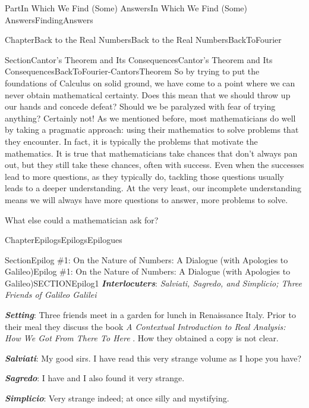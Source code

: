 \documentclass[oneside,10pt,]{book}
\newcommand{\alert}[1]{\textbf{\textit{#1}}}
\newcommand{\pubtitle}[1]{\textsl{#1}}
\numberwithin{equation}{part}
\begin{document}
\begin{partptx}{Part}{In Which We Find (Some) Answers}{}{In Which We Find (Some) Answers}{}{}{FindingAnswers}
\begin{chapterptx}{Chapter}{Back to the Real Numbers}{}{Back to the Real Numbers}{}{}{BackToFourier}
\begin{sectionptx}{Section}{Cantor's Theorem and Its Consequences}{}{Cantor's Theorem and Its Consequences}{}{}{BackToFourier-CantorsTheorem}
So by trying to put the foundations of Calculus on solid ground, we have come to a point where we can never obtain mathematical certainty.  Does this mean that we should throw up our hands and concede defeat?  Should we be paralyzed with fear of trying anything?  Certainly not!  As we mentioned before, most mathematicians do well by taking a pragmatic approach: using their mathematics to solve problems that they encounter.  In fact, it is typically the problems that motivate the mathematics.  It is true that mathematicians take chances that don't always pan out, but they still take these chances, often with success.  Even when the successes lead to more questions, as they typically do, tackling those questions usually leads to a deeper understanding.  At the very least, our incomplete understanding means we will always have more questions to answer, more problems to solve.%
\par
What else could a mathematician ask for?%
\end{sectionptx}
\end{chapterptx}
%
%
\typeout{************************************************}
\typeout{************************************************}
%
\begin{chapterptx}{Chapter}{Epilogs}{}{Epilogs}{}{}{Epilogues}
\renewcommand*{\chaptername}{Chapter}
%
%
\typeout{************************************************}
\typeout{************************************************}
%
\begin{sectionptx}{Section}{Epilog \#1: On the Nature of Numbers: A Dialogue (with Apologies to Galileo)}{}{Epilog \#1: On the Nature of Numbers: A Dialogue (with Apologies to Galileo)}{}{}{SECTIONEpilog1}
\alert{Interlocuters}: \emph{Salviati, Sagredo, and Simplicio; Three Friends of Galileo Galilei}%
\par
\alert{Setting}: Three friends meet in a garden for lunch in Renaissance Italy.  Prior to their meal they discuss the book \pubtitle{A Contextual Introduction to Real Analysis: How We Got From There To Here} . How they obtained a copy is not clear.%
\par
\alert{Salviati}: My good sirs. I have read this very strange volume as I hope you have?%
\par
\alert{Sagredo}: I have and I also found it very strange.%
\par
\alert{Simplicio}: Very strange indeed; at once silly and mystifying.%

\end{sectionptx}
\end{chapterptx}
\end{partptx}
\end{document}
